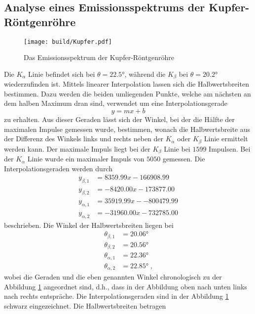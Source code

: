 \subsection{Analyse eines Emissionsspektrums der Kupfer-Röntgenröhre} \label{sec:kupferlinien}
\begin{figure}
    \centering
    \caption{Das Emissionsspektrum der Kupfer-Röntgenröhre}
    \label{fig:Kupfer}
    \texttt{[image: build/Kupfer.pdf]}
\end{figure}
Die $K_\alpha$ Linie befindet sich bei $\theta = \ang{22.5;;}$, während die $K_\beta$ bei  $\theta = \ang{20.2;;}$ wiederzufinden ist.
Mittels linearer Interpolation lassen sich die Halbwertsbreiten bestimmen.
Dazu werden die beiden umliegenden Punkte, welche am nächsten an dem halben Maximum dran sind, verwendet um eine Interpolationsgerade
\begin{equation*}
    y = mx+b 
\end{equation*}
zu erhalten.
Aus dieser Geraden lässt sich der Winkel, bei der die Hälfte der maximalen Impulse gemessen wurde, bestimmen, wonach die Halbwertsbreite
aus der Differenz des Winkels links und rechts neben der $K_\alpha$ oder $K_\beta$ Linie ermittelt werden kann.
Der maximale Impuls liegt bei der $K_\beta$ Linie bei $1599$ Impulsen. 
Bei der $K_\alpha$ Linie wurde ein maximaler Impuls von $5050$ gemessen.
Die Interpolationsgeraden werden durch 
\begin{align*}
    y_{\beta, 1} &= 8359.99x - 166908.99    \\
    y_{\beta, 2} &= -8420.00x - 173877.00   \\
    y_{\alpha, 1} &= 35919.99x - -800479.99  \\
    y_{\alpha, 2} &= -31960.00x - 732785.00
\end{align*}
beschrieben.
Die Winkel der Halbwertsbreiten liegen bei 
\begin{align*}
    \theta_{\beta, 1} &= \ang{20.06;;}\\
    \theta_{\beta, 2} &= \ang{20.56;;}\\
    \theta_{\alpha, 1} &= \ang{22.36;;}\\
    \theta_{\alpha, 2} &= \ang{22.85;;} \; \text{,}
\end{align*}
wobei die Geraden und die eben genannten Winkel chronologisch zu der Abbildung \ref{fig:Kupfer} angeordnet  sind, d.h., dass in der Abbildung 
oben nach unten links nach rechts entspräche.
Die Interpolationsgeraden sind in der Abbildung \ref{fig:Kupfer} schwarz eingezeichnet.
Die Halbwertsbreiten betragen
